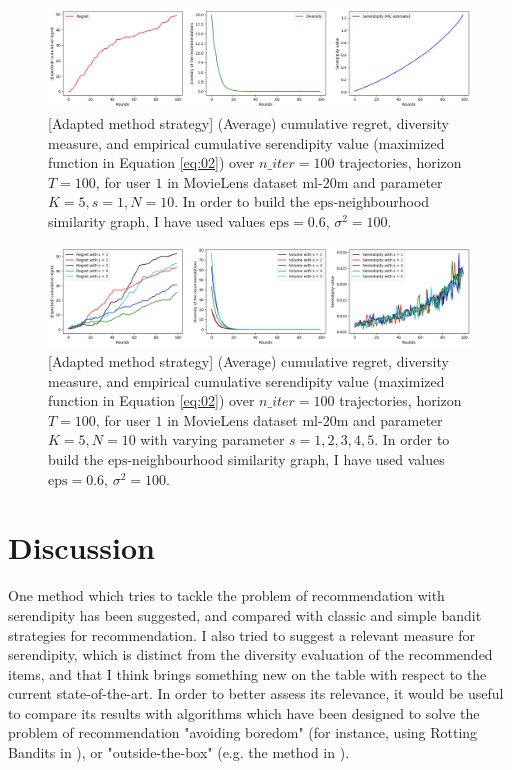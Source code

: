 \documentclass{article}
\begin{document}
\begin{figure}[H]
  \centering
  \includegraphics[scale=0.4]{../Results/ml-20m/lagree-1min49sec.png}
  \caption{[Adapted method strategy] (Average) cumulative regret, diversity measure, and empirical cumulative serendipity value (maximized function in Equation \ref{eq:02}) over $n\_iter=100$ trajectories, horizon $T=100$, for user $1$ in MovieLens dataset $\text{ml-20m}$ and parameter $K=5, s=1, N=10$. In order to build the $\text{eps}$-neighbourhood similarity graph, I have used values $\text{eps}=0.6$, $\sigma^{2}=100$.}
\label{figlagree}
\end{figure}

\begin{figure}[H]
  \centering
  \includegraphics[scale=0.4]{../Results/ml-20m/lagree.png}
  \caption{[Adapted method strategy] (Average) cumulative regret, diversity measure, and empirical cumulative serendipity value (maximized function in Equation \ref{eq:02}) over $n\_iter=100$ trajectories, horizon $T=100$, for user $1$ in MovieLens dataset $\text{ml-20m}$ and parameter $K=5, N=10$ with varying parameter $s=1, 2, 3, 4, 5$. In order to build the $\text{eps}$-neighbourhood similarity graph, I have used values $\text{eps}=0.6$, $\sigma^{2}=100$.}
\label{figlagreecomp}
\end{figure}

\section{Discussion}

One method which tries to tackle the problem of recommendation with serendipity has been suggested, and compared with classic and simple bandit strategies for recommendation. I also tried to suggest a relevant measure for serendipity, which is distinct from the diversity evaluation of the recommended items, and that I think brings something new on the table with respect to the current state-of-the-art. In order to better assess its relevance, it would be useful to compare its results with algorithms which have been designed to solve the problem of recommendation "avoiding boredom" (for instance, using Rotting Bandits in \cite{seznec2018rotting}), or "outside-the-box" (e.g. the method in \cite{abbassi2009getting}).
\end{document}
